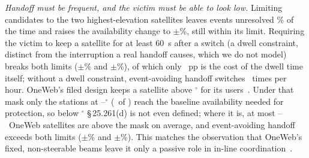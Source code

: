 \documentclass[conference]{IEEEtran}
\begin{document}
\emph{Handoff must be frequent, and the victim must be able to look low.}
Limiting candidates to the two highest-elevation satellites leaves events
unresolved \DepKTwoUnresPct\% of the time and raises the availability change to
\DepKTwoUnavPct$\pm$\DepKTwoUnavCi\%, still within its limit. Requiring the victim to keep a satellite for
at least 60~s after a switch (a dwell constraint, distinct from the interruption
a real handoff causes, which we do not model) breaks both limits
(\DepNSixtyDegrPct$\pm$\DepNSixtyDegrCi\% and \DepNSixtyUnavPct$\pm$\DepNSixtyUnavCi\%),
of which only \DepNSixtySwitchOnlyPct~pp is the cost of the dwell time itself;
without a dwell constraint, event-avoiding handoff switches
\DepNTenSwitchesPerHour\ times per hour.
OneWeb's filed design keeps a satellite above \OnewebMinElevSensDeg$^\circ$ for
its users~\cite[Sec.~2.2]{delportillo2019}. Under that mask only the stations at
\MinElevQualLatLo--\MinElevQualLatHi$^\circ$ (\MinElevQualStations\ of
\NStations) reach the baseline availability needed for protection, so below
\MinElevQualLatLo$^\circ$ \S\,25.261(d) is not even defined; where it is, at most
\MinElevNAboveMin--\MinElevNAboveMax\ OneWeb satellites are above the mask on
average, and event-avoiding handoff exceeds both limits
(\TabMinElevFiftyFiveDegrDivPct$\pm$\TabMinElevFiftyFiveDegrDivCi\% and
\TabMinElevFiftyFiveUnavDivPct$\pm$\TabMinElevFiftyFiveUnavDivCi\%). This matches
the observation that OneWeb's fixed, non-steerable beams leave it only a passive
role in in-line coordination~\cite[Sec.~5.1]{delportillo2019}.
\end{document}
